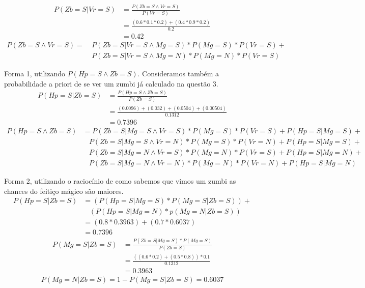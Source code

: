 \documentclass[answers]{exam}
\begin{document}
\begin{questions}
\question
\begin{solution}
\begin{align*}
P(Zb=S|Vr=S) &= \frac{P(Zb=S \land Vr=S)}{P(Vr=S)} \\ 
             &= \frac{(0.6 * 0.1 * 0.2) + (0.4 * 0.9 * 0.2)}{0.2} \\
             &= 0.42
\end{align*}
\begin{align*}
P(Zb=S \land Vr=S) = &\ P(Zb=S|Vr=S \land Mg=S) * P(Mg=S) * P(Vr=S) + \\ 
                     &\ P(Zb=S|Vr=S \land Mg=N) * P(Mg=N) * P(Vr=S)
\end{align*}
\end{solution}

\question
\begin{solution}
Forma 1, utilizando $P(Hp=S \land Zb=S)$. Consideramos também a probabilidade
a priori de se ver um zumbi já calculado na questão 3.
\begin{align*}
P(Hp=S|Zb=S) &= \frac{P(Hp=S \land Zb=S)}{P(Zb=S)} \\
             &= \frac{(0.0096)+(0.032)+(0.0504)+(0.00504)}{0.1312} \\
             &= 0.7396
\end{align*}
\begin{align*}
P(Hp=S \land Zb=S) &= P(Zb=S|Mg=S \land Vr=S)*P(Mg=S)*P(Vr=S)+P(Hp=S|Mg=S)+\\
                   &\ \ \ \ P(Zb=S|Mg=S \land Vr=N)*P(Mg=S)*P(Vr=N)+P(Hp=S|Mg=S)+\\
                   &\ \ \ \ P(Zb=S|Mg=N \land Vr=S)*P(Mg=N)*P(Vr=S)+P(Hp=S|Mg=N)+\\
                   &\ \ \ \ P(Zb=S|Mg=N \land Vr=N)*P(Mg=N)*P(Vr=N)+P(Hp=S|Mg=N)   
\end{align*}

Forma 2, utilizando o raciocínio de como sabemos que vimos um zumbi as chances
do feitiço mágico são maiores.
\begin{align*}
P(Hp=S|Zb=S) &= (P(Hp=S|Mg=S) * P(Mg=S|Zb=S)) + \\
             &\ \ \ \ (P(Hp=S|Mg=N) * p(Mg=N|Zb=S))\\
             &= (0.8*0.3963) + (0.7*0.6037)\\
             &= 0.7396
\end{align*}
\begin{align*}
P(Mg=S|Zb=S) &= \frac{P(Zb=S|Mg=S)*P(Mg=S)}{P(Zb=S)}\\
             &= \frac{((0.6*0.2)+(0.5*0.8))*0.1}{0.1312}\\
             &= 0.3963
\end{align*}
\begin{align*}
P(Mg=N|Zb=S) = 1 - P(Mg=S|Zb=S) = 0.6037    
\end{align*}
\end{solution}


\end{questions}
\end{document}
